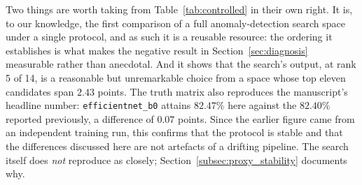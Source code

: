 Two things are worth taking from Table~\ref{tab:controlled} in their own right.
It is, to our knowledge, the first comparison of a full anomaly-detection search
space under a single protocol, and as such it is a reusable resource: the ordering
it establishes is what makes the negative result in Section~\ref{sec:diagnosis}
measurable rather than anecdotal. And it shows that the search's output, at rank 5
of 14, is a reasonable but unremarkable choice from a space whose top eleven
candidates span $2.43$ points. The truth matrix also reproduces the manuscript's
headline number: \texttt{efficientnet\_b0} attains $82.47\%$ here against the
$82.40\%$ reported previously, a difference of $0.07$ points. Since the earlier
figure came from an independent training run, this confirms that the protocol is
stable and that the differences discussed here are not artefacts of a drifting
pipeline. The search itself does \emph{not} reproduce as closely;
Section~\ref{subsec:proxy_stability} documents why.
